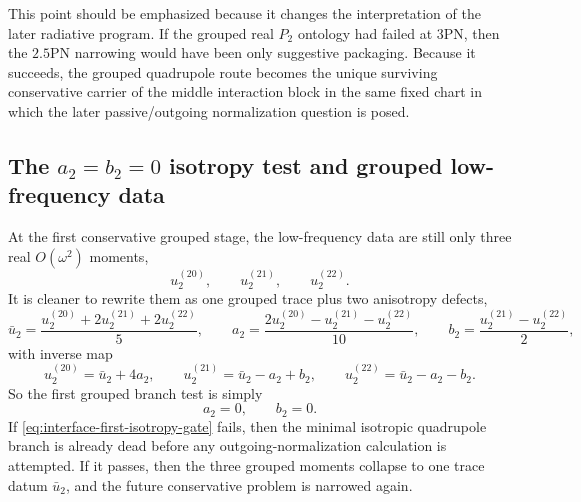 \documentclass[11pt]{article}
\begin{document}
This point should be emphasized because it changes the interpretation of the
later radiative program.  If the grouped real $P_2$ ontology had failed at
$3$PN, then the $2.5$PN narrowing would have been only suggestive packaging.
Because it succeeds, the grouped quadrupole route becomes the unique surviving
conservative carrier of the middle interaction block in the same fixed chart in
which the later passive/outgoing normalization question is posed.

\subsection{The \texorpdfstring{$a_2=b_2=0$}{a 2=b 2=0} isotropy test and grouped low-frequency data}
\label{sec:interface-isotropy}

At the first conservative grouped stage, the low-frequency data are still only
three real $O(\omega^2)$ moments,
\[
u_2^{(20)},\qquad u_2^{(21)},\qquad u_2^{(22)}.
\]
It is cleaner to rewrite them as one grouped trace plus two anisotropy defects,
\begin{equation}
\bar u_2=
\frac{u_2^{(20)}+2u_2^{(21)}+2u_2^{(22)}}{5},
\qquad
 a_2=
\frac{2u_2^{(20)}-u_2^{(21)}-u_2^{(22)}}{10},
\qquad
 b_2=
\frac{u_2^{(21)}-u_2^{(22)}}{2},
\label{eq:interface-trace-defects}
\end{equation}
with inverse map
\begin{equation}
 u_2^{(20)}=\bar u_2+4a_2,
\qquad
 u_2^{(21)}=\bar u_2-a_2+b_2,
\qquad
 u_2^{(22)}=\bar u_2-a_2-b_2.
\label{eq:interface-inverse-map}
\end{equation}
So the first grouped branch test is simply
\begin{equation}
\boxed{a_2=0,
\qquad
b_2=0.}
\label{eq:interface-first-isotropy-gate}
\end{equation}
If \eqref{eq:interface-first-isotropy-gate} fails, then the minimal isotropic
quadrupole branch is already dead before any outgoing-normalization calculation
is attempted.  If it passes, then the three grouped moments collapse to one
trace datum \(\bar u_2\), and the future conservative problem is narrowed again.
\end{document}
